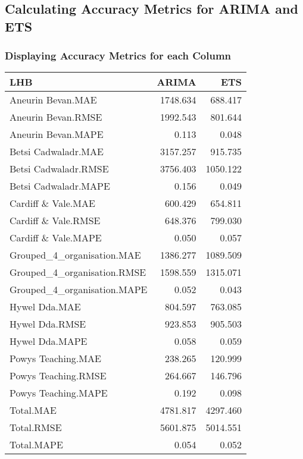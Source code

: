 \documentclass[
]{article}
\begin{document}
\hypertarget{calculating-accuracy-metrics-for-arima-and-ets}{%
\subsection{Calculating Accuracy Metrics for ARIMA and ETS}\label{calculating-accuracy-metrics-for-arima-and-ets}}

\hypertarget{displaying-accuracy-metrics-for-each-column}{%
\subsubsection{Displaying Accuracy Metrics for each Column}\label{displaying-accuracy-metrics-for-each-column}}

\begin{tabular}{l|r|r}
\hline
LHB & ARIMA & ETS\\
\hline
Aneurin Bevan.MAE & 1748.634 & 688.417\\
\hline
Aneurin Bevan.RMSE & 1992.543 & 801.644\\
\hline
Aneurin Bevan.MAPE & 0.113 & 0.048\\
\hline
Betsi Cadwaladr.MAE & 3157.257 & 915.735\\
\hline
Betsi Cadwaladr.RMSE & 3756.403 & 1050.122\\
\hline
Betsi Cadwaladr.MAPE & 0.156 & 0.049\\
\hline
Cardiff \& Vale.MAE & 600.429 & 654.811\\
\hline
Cardiff \& Vale.RMSE & 648.376 & 799.030\\
\hline
Cardiff \& Vale.MAPE & 0.050 & 0.057\\
\hline
Grouped\_4\_organisation.MAE & 1386.277 & 1089.509\\
\hline
Grouped\_4\_organisation.RMSE & 1598.559 & 1315.071\\
\hline
Grouped\_4\_organisation.MAPE & 0.052 & 0.043\\
\hline
Hywel Dda.MAE & 804.597 & 763.085\\
\hline
Hywel Dda.RMSE & 923.853 & 905.503\\
\hline
Hywel Dda.MAPE & 0.058 & 0.059\\
\hline
Powys Teaching.MAE & 238.265 & 120.999\\
\hline
Powys Teaching.RMSE & 264.667 & 146.796\\
\hline
Powys Teaching.MAPE & 0.192 & 0.098\\
\hline
Total.MAE & 4781.817 & 4297.460\\
\hline
Total.RMSE & 5601.875 & 5014.551\\
\hline
Total.MAPE & 0.054 & 0.052\\
\hline
\end{tabular}
\end{document}
